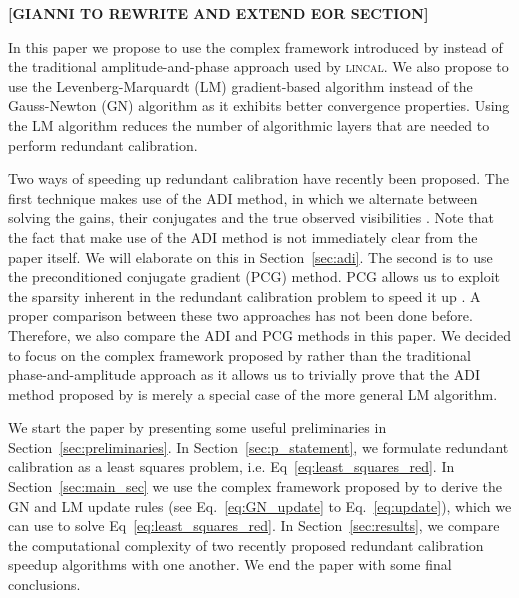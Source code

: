 \documentclass[useAMS,usenatbib]{mn2e}
\begin{document}
\noindent
\textbf{[GIANNI TO REWRITE AND EXTEND EOR SECTION]}

In this paper we propose to use the complex framework introduced by \citet{Smirnov2015} instead of the traditional amplitude-and-phase approach used by \textsc{lincal}.
We also propose to use the Levenberg-Marquardt (LM) gradient-based algorithm instead of the Gauss-Newton (GN) algorithm as it exhibits better convergence properties.
Using the LM algorithm reduces the number of algorithmic layers that are needed to perform redundant calibration. 

Two ways of speeding up redundant calibration have recently been proposed. The first technique makes use of the ADI method, in which we alternate between solving the gains, their conjugates and 
the true observed visibilities \citep{Wijnholds2012,Marthi2014}. Note that the fact that \citet{Marthi2014} make use of the ADI method is not immediately clear
from the paper itself. We will elaborate on this in Section~\ref{sec:adi}. The second is to use the preconditioned conjugate gradient (PCG) method. PCG allows us to exploit the sparsity inherent in the redundant calibration problem 
to speed it up \citep{Liu2010}. A proper comparison between these two approaches has not been done before.
Therefore, we also compare the ADI \citep{Marthi2014} and PCG \citep{Liu2010} methods in this paper. We decided to focus on the complex framework proposed by \citet{Smirnov2015} rather than the traditional phase-and-amplitude approach as it 
allows us to trivially prove that the ADI method proposed by \citep{Marthi2014} is merely a special case of the more general LM algorithm. 


We start the paper by presenting some useful preliminaries in Section~\ref{sec:preliminaries}. In Section~\ref{sec:p_statement}, we formulate redundant calibration 
as a least squares problem, i.e. Eq~\eqref{eq:least_squares_red}. In Section~\ref{sec:main_sec} we use the complex framework proposed by \citet{Smirnov2015} to derive the GN and LM
update rules (see Eq.~\eqref{eq:GN_update} to Eq.~\eqref{eq:update}), which we can use to solve Eq~\eqref{eq:least_squares_red}. In Section~\ref{sec:results}, we compare the computational complexity of two recently proposed redundant calibration speedup algorithms with one another.
We end the paper with some final conclusions.
\end{document}

